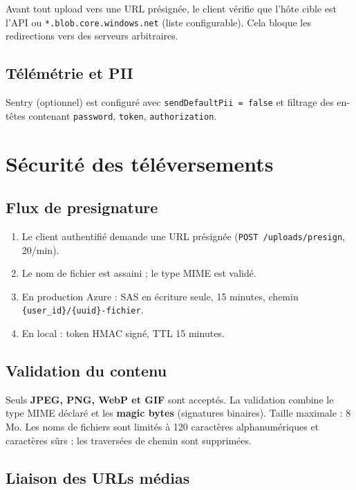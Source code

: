 Avant tout upload vers une URL présignée, le client vérifie que l'hôte cible est l'API ou \texttt{*.blob.core.windows.net} (liste configurable). Cela bloque les redirections vers des serveurs arbitraires.

\subsection{Télémétrie et PII}

Sentry (optionnel) est configuré avec \texttt{sendDefaultPii = false} et filtrage des en-têtes contenant \texttt{password}, \texttt{token}, \texttt{authorization}.


\section{Sécurité des téléversements}

\subsection{Flux de presignature}

\begin{enumerate}
  \item Le client authentifié demande une URL présignée (\texttt{POST /uploads/presign}, 20/min).
  \item Le nom de fichier est assaini ; le type MIME est validé.
  \item En production Azure : SAS en écriture seule, 15 minutes, chemin \texttt{\{user\_id\}/\{uuid\}-fichier}.
  \item En local : token HMAC signé, TTL 15 minutes.
\end{enumerate}

\subsection{Validation du contenu}

Seuls \textbf{JPEG, PNG, WebP et GIF} sont acceptés. La validation combine le type MIME déclaré et les \textbf{magic bytes} (signatures binaires). Taille maximale : 8 Mo. Les noms de fichiers sont limités à 120 caractères alphanumériques et caractères sûrs ; les traversées de chemin sont supprimées.

\subsection{Liaison des URLs médias}

